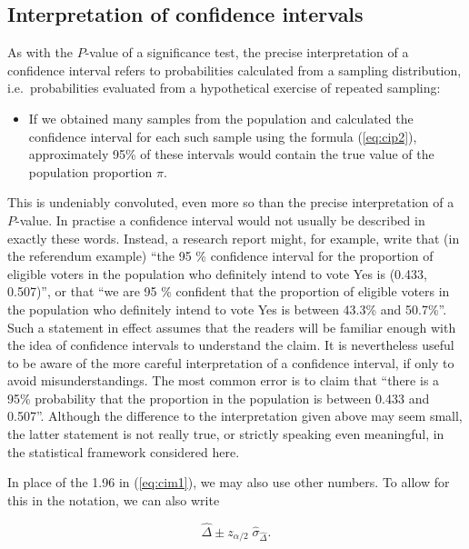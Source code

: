 \documentclass[11pt,a4paper,openany]{book}
\providecommand{\tightlist}{%
  \setlength{\itemsep}{0pt}\setlength{\parskip}{0pt}}
\begin{document}
\subsection{Interpretation of confidence
intervals}\label{s-probs-1sampleci-int}

As with the \(P\)-value of a significance test, the precise
interpretation of a confidence interval refers to probabilities
calculated from a sampling distribution, i.e.~probabilities evaluated
from a hypothetical exercise of repeated sampling:

\begin{itemize}
\tightlist
\item
  If we obtained many samples from the population and calculated the
  confidence interval for each such sample using the formula
  (\ref{eq:cip2}), approximately 95\% of these intervals would contain
  the true value of the population proportion \(\pi\).
\end{itemize}

This is undeniably convoluted, even more so than the precise
interpretation of a \(P\)-value. In practise a confidence interval would
not usually be described in exactly these words. Instead, a research
report might, for example, write that (in the referendum example) ``the
95 \% confidence interval for the proportion of eligible voters in the
population who definitely intend to vote Yes is (0.433, 0.507)'', or
that ``we are 95 \% confident that the proportion of eligible voters in
the population who definitely intend to vote Yes is between 43.3\% and
50.7\%''. Such a statement in effect assumes that the readers will be
familiar enough with the idea of confidence intervals to understand the
claim. It is nevertheless useful to be aware of the more careful
interpretation of a confidence interval, if only to avoid
misunderstandings. The most common error is to claim that ``there is a
95\% probability that the proportion in the population is between 0.433
and 0.507''. Although the difference to the interpretation given above
may seem small, the latter statement is not really true, or strictly
speaking even meaningful, in the statistical framework considered here.

In place of the 1.96 in (\ref{eq:cim1}), we may also use other numbers.
To allow for this in the notation, we can also write

\begin{equation}\hat{\Delta} \pm z_{\alpha/2}\; \hat{\sigma}_{\hat{\Delta}}.
\label{eq:ci-D-gen}\end{equation}
\end{document}

